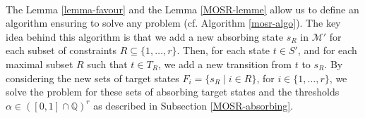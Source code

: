   $ $\\

The Lemma \ref{lemma-favour} and the Lemma \ref{MOSR-lemme} allow us to define an algorithm ensuring to solve any \MOSR{} problem (cf. Algorithm \ref{mosr-algo}). The key idea behind this algorithm is that we add a new absorbing state $s_R$ in $\mathcal{M'}$ for each subset of constraints $R \subseteq \{1, \dots, r\}$.
Then, for each state $t \in S'$, and for each maximal subset $R$ such that $t \in T_R$, we add a new transition from $t$ to $s_R$.
By considering the new sets of target states $F_i = \{ s_R \; | \; i \in R\}$, for $i \in \{1, \dots, r\}$,
we solve the \MOSR{} problem for these sets of absorbing target states and the thresholds $\alpha \in ([0,1] \cap \mathbb{Q})^r$ as described in Subsection \ref{MOSR-absorbing}.

